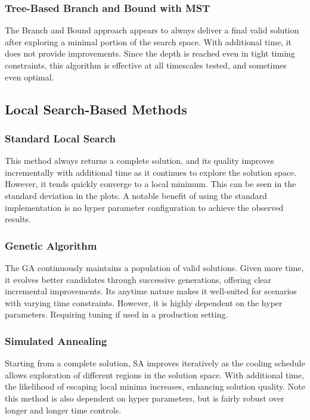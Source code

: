 \documentclass[11pt]{article}
\begin{document}
	\subsubsection{Tree-Based Branch and Bound with MST} 
	The Branch and Bound approach appears to always deliver a final valid solution after exploring a minimal portion of the search space. With additional time, it does not provide improvements. Since the depth is reached even in tight timing constraints, this algorithm is effective at all timescales tested, and sometimes even optimal.
	
	\subsection{Local Search-Based Methods}
	\subsubsection{Standard Local Search}
	This method always returns a complete solution, and its quality improves incrementally with additional time as it continues to explore the solution space. However, it tends quickly converge to a local minimum. This can be seen in the standard deviation in the plots. A notable benefit of using the standard implementation is no hyper parameter configuration to achieve the observed results. 
	
	\subsubsection{Genetic Algorithm} 
	The GA continuously maintains a population of valid solutions. Given more time, it evolves better candidates through successive generations, offering clear incremental improvements. Its anytime nature makes it well-suited for scenarios with varying time constraints. However, it is highly dependent on the hyper parameters. Requiring tuning if used in a production setting.
	
	\subsubsection{Simulated Annealing} 
	Starting from a complete solution, SA improves iteratively as the cooling schedule allows exploration of different regions in the solution space. With additional time, the likelihood of escaping local minima increases, enhancing solution quality. Note this method is also dependent on hyper parameters, but is fairly robust over longer and longer time controls.
	
\end{document}
